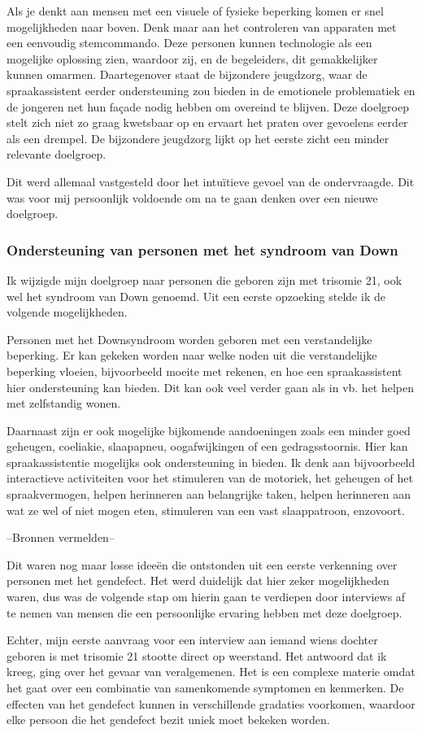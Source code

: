 Als je denkt aan mensen met een visuele of fysieke beperking komen er snel mogelijkheden naar boven. Denk maar aan het controleren van apparaten met een eenvoudig stemcommando. Deze personen kunnen technologie als een mogelijke oplossing zien, waardoor zij, en de begeleiders, dit gemakkelijker kunnen omarmen.
Daartegenover staat de bijzondere jeugdzorg, waar de spraakassistent eerder ondersteuning zou bieden in de emotionele problematiek en de jongeren net hun façade nodig hebben om overeind te blijven. Deze doelgroep stelt zich niet zo graag kwetsbaar op en ervaart het praten over gevoelens eerder als een drempel. De bijzondere jeugdzorg lijkt op het eerste zicht een minder relevante doelgroep.

Dit werd allemaal vastgesteld door het intuïtieve gevoel van de ondervraagde. Dit was voor mij persoonlijk voldoende om na te gaan denken over een nieuwe doelgroep.

\subsubsection{Ondersteuning van personen met het syndroom van Down}
\label{ondersteuning van personen met het syndroom van Down}
Ik wijzigde mijn doelgroep naar personen die geboren zijn met trisomie 21, ook wel het syndroom van Down genoemd. Uit een eerste opzoeking stelde ik de volgende mogelijkheden.

Personen met het Downsyndroom worden geboren met een verstandelijke beperking. Er kan gekeken worden naar welke noden uit die verstandelijke beperking vloeien, bijvoorbeeld moeite met rekenen, en hoe een spraakassistent hier ondersteuning kan bieden. Dit kan ook veel verder gaan als in vb. het helpen met zelfstandig wonen.

Daarnaast zijn er ook mogelijke bijkomende aandoeningen zoals een minder goed geheugen, coeliakie, slaapapneu, oogafwijkingen of een gedragsstoornis. Hier kan spraakassistentie mogelijks ook ondersteuning in bieden. Ik denk aan bijvoorbeeld interactieve activiteiten voor het stimuleren van de motoriek, het geheugen of het spraakvermogen, helpen herinneren aan belangrijke taken, helpen herinneren aan wat ze wel of niet mogen eten, stimuleren van een vast slaappatroon, enzovoort.

--Bronnen vermelden--

Dit waren nog maar losse ideeën die ontstonden uit een eerste verkenning over personen met het gendefect. Het werd duidelijk dat hier zeker mogelijkheden waren, dus was de volgende stap om hierin gaan te verdiepen door interviews af te nemen van mensen die een persoonlijke ervaring hebben met deze doelgroep.

Echter, mijn eerste aanvraag voor een interview aan iemand wiens dochter geboren is met trisomie 21 stootte direct op weerstand. Het antwoord dat ik kreeg, ging over het gevaar van veralgemenen. Het is een complexe materie omdat het gaat over een combinatie van samenkomende symptomen en kenmerken. De effecten van het gendefect kunnen in verschillende gradaties voorkomen, waardoor elke persoon die het gendefect bezit uniek moet bekeken worden.
